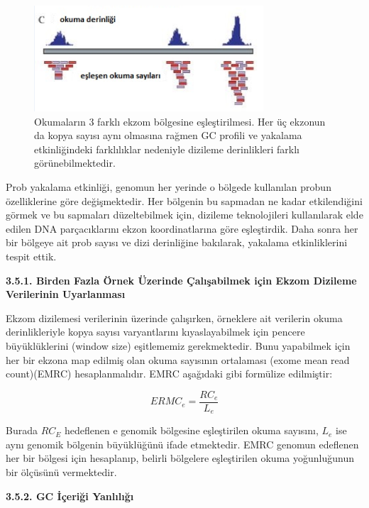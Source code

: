 \documentclass[11pt]{article}
\begin{document}
\begin{figure}[htb]
\begin{center}
  \includegraphics[scale=0.75]{exomedepth.png}
\end{center}
\caption{Okumaların 3 farklı ekzom bölgesine eşleştirilmesi. Her üç ekzonun da kopya sayısı aynı olmasına rağmen GC profili ve yakalama etkinliğindeki farklılıklar nedeniyle dizileme derinlikleri farklı görünebilmektedir.}
\label{fig:exomedepth}
\end{figure}

 Prob yakalama etkinliği, genomun her yerinde o bölgede kullanılan probun özelliklerine göre değişmektedir. Her bölgenin bu sapmadan ne kadar etkilendiğini görmek ve bu sapmaları düzeltebilmek için, dizileme teknolojileri kullanılarak elde edilen DNA parçacıklarını ekzon koordinatlarına göre eşleştirdik. Daha sonra her bir bölgeye ait prob sayısı ve dizi derinliğine bakılarak, yakalama etkinliklerini tespit ettik. 

{\bf 3.5.1. Birden Fazla Örnek Üzerinde Çalışabilmek için Ekzom Dizileme Verilerinin Uyarlanması}

Ekzom dizilemesi verilerinin üzerinde çalışırken, örneklere ait verilerin okuma derinlikleriyle kopya sayısı varyantlarını kıyaslayabilmek için pencere büyüklüklerini (window size) eşitlememiz gerekmektedir. Bunu yapabilmek için her bir ekzona map edilmiş olan okuma sayısının ortalaması (exome mean read count)(EMRC) hesaplanmalıdır. EMRC aşağıdaki gibi formülize edilmiştir:

\[ERMC_e = \frac{RC_e}{L_e}\]

Burada $RC_E$ hedeflenen e genomik bölgesine eşleştirilen okuma sayısını, $L_e$ ise aynı genomik bölgenin büyüklüğünü ifade etmektedir. EMRC genomun edeflenen her bir bölgesi için hesaplanıp, belirli bölgelere eşleştirilen okuma yoğunluğunun bir ölçüsünü vermektedir. 

{\bf 3.5.2. GC İçeriği Yanlılığı}
\end{document}
